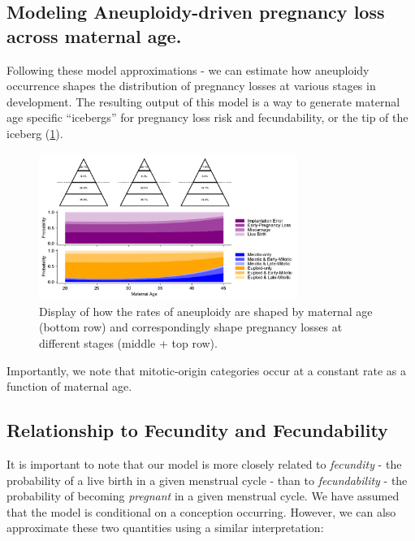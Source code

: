 \documentclass{article}
\begin{document}
\subsection*{Modeling Aneuploidy-driven pregnancy loss across maternal age.}

Following these model approximations - we can estimate how aneuploidy occurrence shapes the distribution of pregnancy losses at various stages in development. The resulting output of this model is a way to generate maternal age specific ``icebergs'' for pregnancy loss risk and fecundability, or the tip of the iceberg (\ref{fig:2}). 

\begin{figure}[H]
\begin{center}
    \includegraphics[width=0.75\textwidth]{figures/model_figure.042024.pdf}
\end{center}
\vspace{-1.5em}
\caption{Display of how the rates of aneuploidy are shaped by maternal age (bottom row) and correspondingly shape pregnancy losses at different stages (middle + top row).}
\label{fig:2}
\end{figure}

Importantly, we note that mitotic-origin categories occur at a constant rate as a function of maternal age. 

\subsection*{Relationship to Fecundity and Fecundability}

It is important to note that our model is more closely related to \textit{fecundity} - the probability of a live birth in a given menstrual cycle - than to \textit{fecundability} - the probability of becoming \textit{pregnant} in a given menstrual cycle. We have assumed that the model is conditional on a conception occurring. However, we can also approximate these two quantities using a similar interpretation: 
\end{document}
